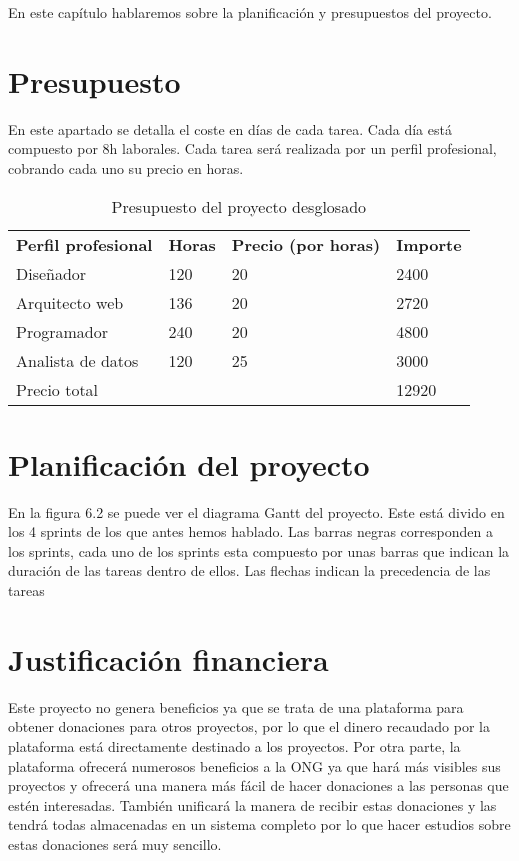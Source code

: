 
En este capítulo hablaremos sobre la planificación y presupuestos del proyecto.

\section{Presupuesto}
En este apartado se detalla el coste en días de cada tarea. Cada día está compuesto por 8h laborales. Cada tarea será realizada por un perfil profesional, cobrando cada uno su precio en horas.


\begin{table}[]
	\centering
	\begin{tabular}{llll}
		\textbf{Perfil profesional} & \textbf{Horas} & \textbf{Precio (por horas)} & \textbf{Importe} \\
		Diseñador                   & 120            & 20                          & 2400             \\
		Arquitecto web              & 136            & 20                          & 2720             \\
		Programador                 & 240            & 20                          & 4800             \\
		Analista de datos           & 120            & 25                          & 3000             \\
		\hline Precio total                &                &                             & 12920
	\end{tabular}
	\caption{Presupuesto del proyecto desglosado}
	\label{precios}
\end{table}


\section{Planificación del proyecto}

En la figura 6.2 se puede ver el diagrama Gantt del proyecto. Este está divido en los 4 sprints de los que antes hemos hablado. Las barras negras corresponden a los sprints, cada uno de los sprints esta compuesto por unas barras que indican la duración de las tareas dentro de ellos. Las flechas indican la precedencia de las tareas


\section{Justificación financiera}

Este proyecto no genera beneficios ya que se trata de una plataforma para obtener donaciones para otros proyectos, por lo que el dinero recaudado por la plataforma está directamente destinado a los proyectos. Por otra parte, la plataforma ofrecerá numerosos beneficios a la ONG ya que hará más visibles sus proyectos y ofrecerá una manera más fácil de hacer donaciones a las personas que estén interesadas. También unificará la manera de recibir estas donaciones y las tendrá todas almacenadas en un sistema completo por lo que hacer estudios sobre estas donaciones será muy sencillo.
